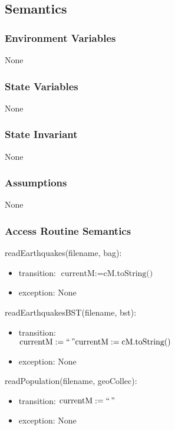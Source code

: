 \documentclass[12pt]{article}
\begin{document}
\subsection* {Semantics}

\subsubsection* {Environment Variables}

None

\subsubsection* {State Variables}

None

\subsubsection* {State Invariant}

None

\subsubsection* {Assumptions}

None

\subsubsection* {Access Routine Semantics}

\noindent readEarthquakes(filename, bag):
\begin{itemize}
\item transition: $\mbox{currentM} := \mbox{cM.toString()}$
\item exception: None
\end{itemize}

\noindent readEarthquakesBST(filename, bst):
\begin{itemize}
\item transition: \\ $\mbox{currentM} := ` ` \,  " \\
\mbox{currentM} := \mbox{cM.toString()}$
\item exception: None
\end{itemize}

\noindent readPopulation(filename, geoCollec):
\begin{itemize}
\item transition: $\mbox{currentM} := ` ` \,  "$
\item exception: None
\end{itemize}
\end{document}

